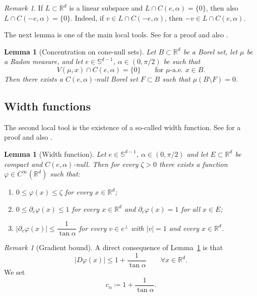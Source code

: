 \documentclass[11pt,a4paper]{article}
\newcommand{\R}{\mathbb{R}}
\newtheorem{lem}[thm]{Lemma}
\theoremstyle{definition}
\theoremstyle{remark}
\newtheorem{rem}[thm]{Remark}
\begin{document}
\begin{rem}\label{rem:minuscone}
If $L\subset\R^d$ is a linear subspace and $L\cap C(e,\alpha)=\{0\}$, then also $L\cap C(-e,\alpha)=\{0\}$.
Indeed, if $v\in L\cap C(-e,\alpha)$, then $-v\in L\cap C(e,\alpha)$.
\end{rem}

The next lemma is one of the main local tools. See \cite[Lemma 7.5]{AM16} for a proof and also \cite[Lemma 2.3]{DMM}.

\begin{lem}[Concentration on cone-null sets]\label{lem:Cnull}
Let $B\subset\R^d$ be a Borel set, let $\mu$ be a Radon measure, and let $e\in \mathbb{S}^{d-1}$, $\alpha\in(0,\pi/2)$ be such that
$$
V(\mu,x)\cap C(e,\alpha)=\{0\}
\qquad\text{for $\mu$-a.e.\ }x\in B.
$$
Then there exists a $C(e,\alpha)$-null Borel set $F\subset B$ such that $\mu(B\setminus F)=0$.
\end{lem}


\subsection{Width functions}

The second local tool is the existence of a so-called width function. See \cite[Lemma 4.12]{AM16} for a proof and also \cite[Lemma 2.4]{DMM}.

\begin{lem}[Width function]\label{lem:width}
Let $e\in \mathbb{S}^{d-1}$, $\alpha\in(0,\pi/2)$ and let $E\subset\R^d$ be compact and $C(e,\alpha)$-null.
Then for every $\zeta>0$ there exists a function $\varphi\in C^\infty(\R^d)$ such that:
\begin{enumerate}[label=\rm(\roman*),leftmargin=2em]
\item $0\le \varphi(x)\le \zeta$ for every $x \in \R^d$;
\item $0\le \partial_e\varphi(x)\le 1$ for every $x \in \R^d$ and $\partial_e\varphi(x)=1$ for all $x \in E$;
\item $|\partial_v\varphi(x)| \le \dfrac{1}{\tan\alpha}$ for every $v \in e^\perp$ with $|v|=1$ and every $x \in \R^d$.
\end{enumerate}
\end{lem}

\begin{rem}[Gradient bound]\label{rem:gradphi}
A direct consequence of Lemma~\ref{lem:width} is that
$$
|D\varphi(x)|
\le 1+\frac{1}{\tan\alpha}
\qquad\forall x\in\R^d.
$$
We set
$$
c_\alpha\coloneqq 1+\frac{1}{\tan\alpha}.
$$
\end{rem}
\end{document}
